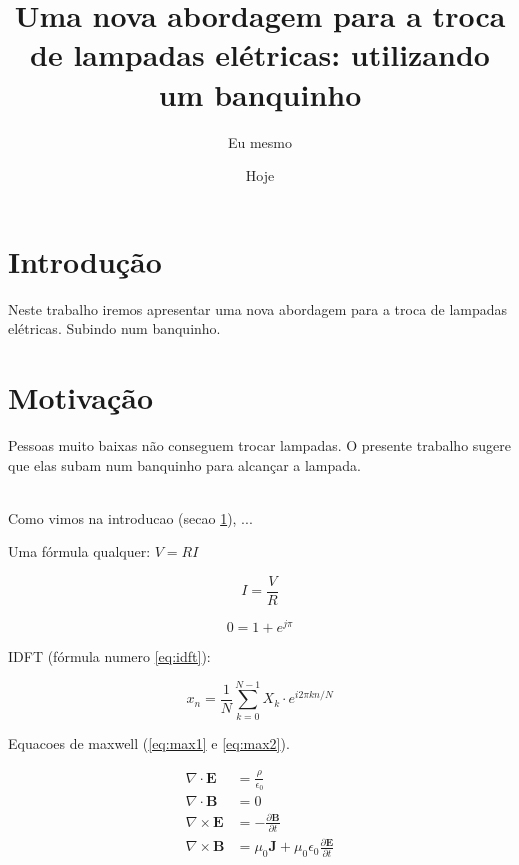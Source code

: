 \documentclass{article}
\author{Eu mesmo}
\date{Hoje}
\title{Uma nova abordagem para a troca de
       lampadas elétricas: utilizando um banquinho}
\newcommand{\vetor}[1]{\textbf{#1}}
\begin{document}
\maketitle

\newpage

\section{Introdução}
\label{sec:intro}

Neste trabalho  iremos apresentar uma nova abordagem
para a troca  de lampadas elétricas.
Subindo  num  banquinho. %


\section{Motivação}
\label{sec:motiv}

Pessoas muito baixas não conseguem trocar lampadas.
O presente trabalho sugere que elas subam num
banquinho para alcançar a lampada.

\hfill \\

Como vimos na introducao (secao \ref{sec:intro}),
...

Uma fórmula qualquer: $V=R I$

$$I = \frac{V}{R}$$

$$0=1+e^{j\pi}$$

IDFT (fórmula numero \ref{eq:idft}):

\begin{equation}
\label{eq:idft}
x_n = \frac{1}{N}
\sum_{k=0}^{N-1} X_k \cdot
e^{i2\pi kn/N}
\end{equation}

Equacoes de maxwell (\ref{eq:max1} e \ref{eq:max2}).

\begin{align}
\label{eq:max1}
\nabla \cdot \vetor{E} & = \frac{\rho}{\epsilon_0} \\
\label{eq:max2}
\nabla \cdot \vetor{B} & = 0 \\
\nabla \times \vetor{E}
& = - \frac{\partial \vetor{B}}{\partial t} \\
\nabla \times \vetor{B} & =
\mu_0\vetor{J} + \mu_0 \epsilon_0
\frac{\partial \vetor{E}}{\partial t}
\end{align}
\end{document}
